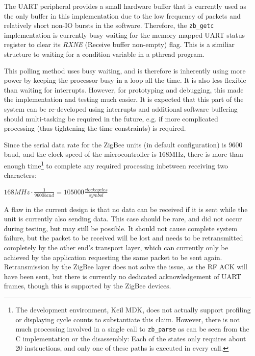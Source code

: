 The UART peripheral provides a small hardware buffer that is currently used as the only buffer in this implementation due to the low frequency of packets and relatively short non-IO bursts in the software. Therefore, the \texttt{zb\_getc} implementation is currently busy-waiting for the memory-mapped UART status register to clear its \emph{RXNE} (Receive buffer non-empty) flag. This is a similiar structure to waiting for a condition variable in a pthread program. %

This polling method uses busy waiting, and is therefore is inherently using more power by keeping the processor busy in a loop all the time. It is also less flexible than waiting for interrupts. However, for prototyping and debugging, this made the implementation and testing much easier. It is expected that this part of the system can be re-developed using interrupts and additional software buffering should multi-tasking be required in the future, e.g. if more complicated processing (thus tightening the time constraints) is required.

Since the serial data rate for the ZigBee units (in default configuration) is 9600 baud, and the clock speed of the microcontroller is 168MHz, there is more than enough time\footnote{The development environment, Keil MDK, does not actually support profiling or displaying cycle counts to substantiate this claim. However, there is not much processing involved in a single call to \texttt{zb\_parse} as can be seen from the C implementation or the disassembly: Each of the states only requires about 20 instructions, and only one of these paths is executed in every call.} to complete any required processing inbetween receiving two characters:

\begin{centered}
	$168 \unit{MHz} \cdot \frac{1}{9600 \unit{baud}} = 105000 \unit{\frac{clock cycles}{symbol}}$
\end{centered}

A flaw in the current design is that no data can be received if it is sent while the unit is currently also sending data. This case should be rare, and did not occur during testing, but may still be possible. It should not cause complete system failure, but the packet to be received will be lost and needs to be retransmitted completely by the other end's transport layer, which can currently only be achieved by the application requesting the same packet to be sent again. Retransmission by the ZigBee layer does not solve the issue, as the RF ACK will have been sent, but there is currently no dedicated acknowledgement of UART frames, though this is supported by the ZigBee devices. %

